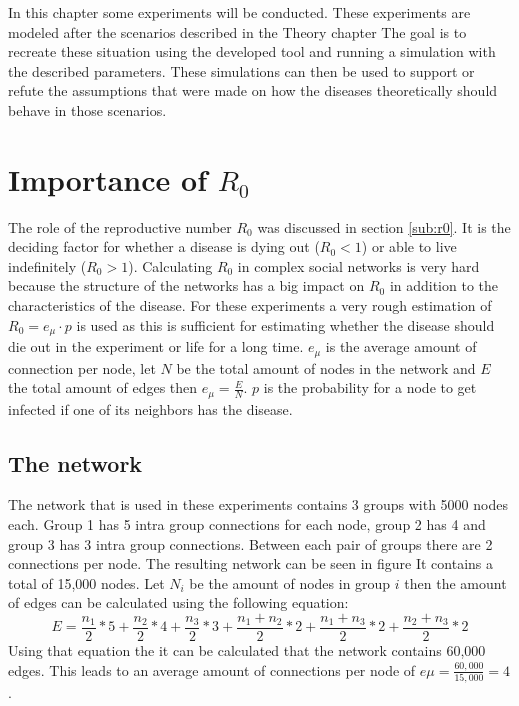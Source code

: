 In this chapter some experiments will be conducted. These experiments are modeled
after the scenarios described in the Theory chapter %
The goal is to recreate these situation using the developed tool and running a
simulation with the described parameters. These simulations can then be used
to support or refute the assumptions that were made on how the diseases
theoretically should behave in those scenarios.

\section{Importance of $R_0$}
The role of the reproductive number $R_0$ was discussed in section \ref{sub:r0}.
It is the deciding factor for whether a disease is dying out ($R_0 < 1$) 
or able to live indefinitely ($R_0 > 1$). Calculating $R_0$ in complex social
networks is very hard because the structure of the networks has a big impact on $R_0$
in addition to the characteristics of the disease. For these experiments a very
rough estimation of $R_0=e_\mu \cdot p$ is used as this is sufficient for estimating whether
the disease should die out in the experiment or life for a long time.
$e_\mu$ is the average amount of connection per node, let $N$ be the total
amount of nodes in the network and $E$ the total amount of edges then
$e_\mu=\frac{E}{N}$. $p$ is the probability for a node to get infected
if one of its neighbors has the disease.

\subsection{The network}
The network that is used in these experiments contains 3 groups with 5000 nodes
each. Group 1 has 5 intra group connections for each node, group 2 has 4 and
group 3 has 3 intra group connections. Between each pair of groups there are
2 connections per node. The resulting network can be seen in figure %
It contains a total of 15,000 nodes. Let $N_i$ be the amount of nodes in group $i$
then the amount of edges can be calculated using the following equation:
\begin{equation}
    E = \frac{n_1}{2} * 5 + \frac{n_2}{2} * 4 + \frac{n_3}{2} * 3 + \frac{n_1+n_2}{2} * 2 + \frac{n_1+n_3}{2} * 2 + \frac{n_2+n_3}{2} * 2
\end{equation}
Using that equation the it can be calculated that the network contains 60,000 edges.
This leads to an average amount of connections per node of $e\mu=\frac{60,000}{15,000} = 4$.

